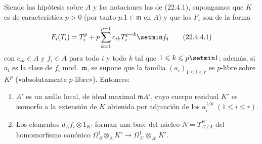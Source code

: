 \begin{proposition}[22.4.4]
\label{0.22.4.4-fr}
Siendo las hipótesis sobre $A$ y las notaciones las de \textup{(22.4.1)}, supongamos
que $K$ es de característica $p>0$ (por tanto $p.1\in\mathfrak m$ en
$A$) y que los $F_i$ son de la forma
\begin{equation}
\label{0.22.4.4.1-fr}
  F_i(T_i)=T_i^p+p\sum_{k=1}^{p-1}c_{ik}T_i^{p-k}\setmin f_{\boldsymbol{i}}
  \tag{22.4.4.1}
\end{equation}
con $c_{ik}\in A$ y $f_i\in A$ para todo $i$ y todo $k$ tal que
$1\leqslant k\leqslant p\setmin 1$; además, si $a_{\boldsymbol{i}}$ es la clase de $f_i$
\textup{mod.}~$\mathfrak m$, se supone que la familia $(a_i)_{1\leqslant i\leqslant r}$
es $p$-libre sobre $K^p$ \textup{(«absolutamente $p$-libre»)}. Entonces:
\begin{enumerate}
  \item[\textup{(i)}] $A'$ es un anillo local, de ideal maximal $\mathfrak mA'$,
  cuyo cuerpo residual $K'$ es isomorfo a la extensión de $K$ obtenida por
  adjunción de los $a_i^{1/p}$ $(1\leqslant i\leqslant r)$.


  \item[\textup{(ii)}] Los elementos $d_Af_i\otimes1_{K'}$ forman una base del núcleo
  $N=\Upsilon^{K'}_{A'/A}$ del homomorfismo canónico
  $\Omega^1_A\otimes_AK'\longrightarrow\Omega^1_{A'}\otimes_{A'}K'$.
\end{enumerate}
\end{proposition}

